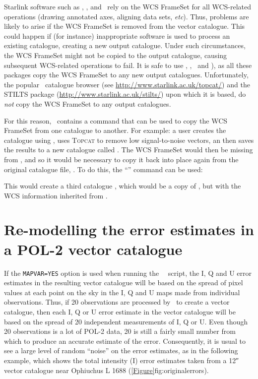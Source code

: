 Starlink software such as \polpack, \Kappa, and \gaia\ rely on the WCS
FrameSet for all WCS-related operations (drawing annotated axes, aligning
data sets, \emph{etc}). Thus, problems are likely to arise if the WCS FrameSet
is removed from the vector catalogue. This could happen if (for instance)
inappropriate software is used to process an existing catalogue, creating a
new output catalogue. Under such circumstances, the WCS FrameSet might
not be copied to the output catalogue, causing subsequent WCS-related
operations to fail. It is safe to use \POLPACK, \KAPPA, \GAIA\ and
), as all these packages copy the WCS
FrameSet to any new output catalogues. Unfortunately, the popular
\topcat\ catalogue browser (see
\url{http://www.starlink.ac.uk/topcat/}) and the STILTS package
(\url{http://www.starlink.ac.uk/stilts/}) upon which it is based, do
\emph{not} copy the WCS FrameSet to any output catalogues.

For this reason, \POLPACK\ contains a command that can be used to copy the
WCS FrameSet from one catalogue to another.  For example: a user creates
the catalogue  using \poltwomap, uses \textsc{Topcat}
to remove low signal-to-noise vectors, an then saves the results to a new catalogue
called . The WCS FrameSet would then be missing from ,
and so it would be necessary to copy it back into place again from the original catalogue
file, . To do this, the ``''
command can be used:

\begin{terminalv}
\end{terminalv}

This would create a third catalogue , which would be a copy of
, but with the WCS information inherited from .


\section{Re-modelling the error estimates in a POL-2 vector catalogue}

If the \texttt{MAPVAR=YES} option is used when running the \smurf\ \poltwomap\ script, the I, Q and U error estimates in the resulting vector catalogue will be based on the spread of pixel values at each point on the sky in the I, Q and U maps made from individual observations. Thus, if 20 observations are processed by \poltwomap\ to create a vector catalogue, then each I, Q or U error estimate in the vector catalogue will be based on the spread of 20 independent measurements of I, Q or U.  Even though 20 observations is a lot of POL-2 data, 20 is still a fairly small number from which to produce an accurate estimate of the error. Consequently, it is usual to see a large level of random ``noise'' on the error estimates, as in the following example, which shows the total intensity (I) error estimates taken from a 12\si{\arcsecond} vector catalogue near Ophiuchus L 1688 (\cref{Figure}{fig:originalerrors}{}).

